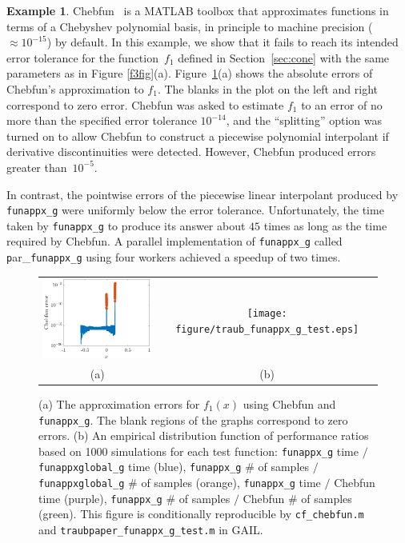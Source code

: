 \documentclass[review]{elsarticle}
\theoremstyle{definition}
\newtheorem{exmp}{Example}
\newcommand{\funappxg}{\texttt{funappx\_g}\xspace}
\newcommand{\funappxglobalg}{\texttt{funappxglobal\_g}\xspace}
\begin{document}
\begin{exmp}
Chebfun~\cite{TrefEtal16a} is a MATLAB toolbox that approximates functions in
terms of a Chebyshev polynomial basis, in principle to machine precision
($\approx 10^{-15}$) by default. In this example, we show that it fails to reach
its intended error tolerance for the function~$f_1$ defined in
Section~\ref{sec:cone} with the same parameters as in Figure \ref{f3fig}(a).
Figure~\ref{f3chebfig}(a) shows the absolute errors of Chebfun's approximation to
$f_1$. The blanks in the plot on the left and right correspond to zero error.
Chebfun was asked to estimate $f_1$ to an error of no more than the specified
error tolerance $10^{-14}$, and the ``splitting'' option was turned on to allow
Chebfun to construct a piecewise polynomial interpolant if derivative
discontinuities were detected. However, Chebfun produced errors greater than~$10^{-5}$.

In contrast, the pointwise errors of the piecewise linear interpolant produced
by \funappxg{} were uniformly below the error tolerance. Unfortunately, the time
taken by \funappxg{} to produce its answer about $45$ times as long as the time
required by Chebfun. A parallel implementation of \funappxg called {\texttt
par\_}\funappxg{} using four workers achieved a speedup of two times.

%
\begin{figure}[tb]
\centering
\begin{tabular}{cc}
\includegraphics[width=5.7cm]{figure/chebfun_errors.eps} \hspace{-2.5ex} &
\texttt{[image: figure/traub\_funappx\_g\_test.eps]}
\\ (a) & (b)
\end{tabular}
\caption{(a) The approximation errors for $f_1(x)$ using  Chebfun and  
\funappxg. The blank regions of the graphs correspond to zero errors. 
(b) An empirical distribution function of performance ratios based on 1000
simulations for each test function: \funappxg{} time $/$ \funappxglobalg{} time
(blue), \funappxg{} \# of samples $/$ \funappxglobalg{} \# of samples (orange),
\funappxg{} time $/$ Chebfun time (purple), \funappxg{} \# of samples $/$
Chebfun \# of samples (green). This figure is conditionally reproducible by \texttt{cf\_chebfun.m} and
\texttt{traubpaper\_funappx\_g\_test.m} in GAIL.
\label{f3chebfig}} %
\end{figure}

\end{exmp}
\end{document}
